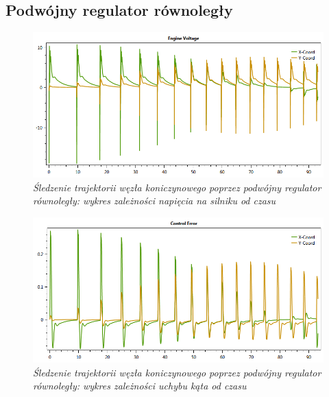 \documentclass[12pt, twoside, openany]{report}
\theoremstyle{definition}
\begin{document}
\begin{appendices}
\section{Podwójny regulator równoległy}
\begin{figure}[H]
	\centering
		\includegraphics[width = 400pt]{TrefoilKnotParallelEV} 
		\caption{\textit{Śledzenie trajektorii węzła koniczynowego poprzez podwójny regulator równoległy: wykres zależności napięcia na silniku od czasu}}
		\label{plot:TrefoilKnotParallelEV}
\end{figure}

\begin{figure}[H]
	\centering
		\includegraphics[width = 400pt]{TrefoilKnotParallelCE} 
		\caption{\textit{Śledzenie trajektorii węzła koniczynowego poprzez podwójny regulator równoległy: wykres zależności uchybu kąta od czasu}}
		\label{plot:TrefoilKnotParallelCE}
\end{figure}


\end{appendices}
\end{document}
